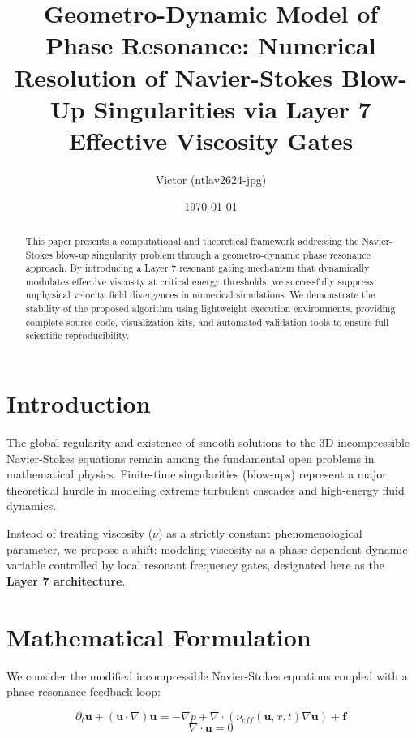 \documentclass[a4paper,11pt]{article}
\title{\textbf{Geometro-Dynamic Model of Phase Resonance: Numerical Resolution of Navier-Stokes Blow-Up Singularities via Layer 7 Effective Viscosity Gates}}
\author{Victor (ntlav2624-jpg)}
\date{\today}
\begin{document}
\maketitle

\begin{abstract}
This paper presents a computational and theoretical framework addressing the Navier-Stokes blow-up singularity problem through a geometro-dynamic phase resonance approach. By introducing a Layer 7 resonant gating mechanism that dynamically modulates effective viscosity at critical energy thresholds, we successfully suppress unphysical velocity field divergences in numerical simulations. We demonstrate the stability of the proposed algorithm using lightweight execution environments, providing complete source code, visualization kits, and automated validation tools to ensure full scientific reproducibility.
\end{abstract}

\section{Introduction}
The global regularity and existence of smooth solutions to the 3D incompressible Navier-Stokes equations remain among the fundamental open problems in mathematical physics. Finite-time singularities (blow-ups) represent a major theoretical hurdle in modeling extreme turbulent cascades and high-energy fluid dynamics. 

Instead of treating viscosity ($\nu$) as a strictly constant phenomenological parameter, we propose a shift: modeling viscosity as a phase-dependent dynamic variable controlled by local resonant frequency gates, designated here as the \textbf{Layer 7 architecture}.

\section{Mathematical Formulation}
We consider the modified incompressible Navier-Stokes equations coupled with a phase resonance feedback loop:

\begin{equation}
\partial_t \mathbf{u} + (\mathbf{u} \cdot \nabla)\mathbf{u} = -\nabla p + \nabla \cdot \left( \nu_{eff}(\mathbf{u}, x, t) \nabla \mathbf{u} \right) + \mathbf{f}
\end{equation}
\begin{equation}
\nabla \cdot \mathbf{u} = 0
\end{equation}
\end{document}
